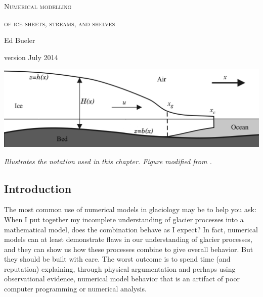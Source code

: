 \documentclass[letterpaper,final,12pt,reqno]{amsart}
\begin{document}
\graphicspath{{../photos/}{../pdffigs/}}

\begin{titlepage}

  \begin{center}
  \phantom{foo}
    \vspace{1.0cm}

     {\Large \textsc{Numerical modelling}}
    \vspace{0.7cm}

     {\Large \textsc{of ice sheets, streams, and shelves}}

    \vspace{1.5cm}

    {\large Ed Bueler}
    \vspace{1cm}

    version July 2014

    \vfill
    
    \includegraphics[width=6.0in]{flowline}
  
    \scriptsize \emph{Illustrates the notation used in this chapter.  Figure modified from \cite{SchoofMarine1}.} \normalsize
    
    \vspace{1.5in}
  \end{center}
\end{titlepage}

\clearpage\newpage

\setcounter{section}{1}
\subsection{Introduction}

The most common use of numerical models in glaciology may be to help you ask: When I put together my incomplete understanding of glacier processes into a mathematical model, does the combination behave as I expect?  In fact, numerical models can at least demonstrate flaws in our understanding of glacier processes, and they can show us how these processes combine to give overall behavior.  But they should be built with care.  The worst outcome is to spend time (and reputation) explaining, through physical argumentation and perhaps using observational evidence, numerical model behavior that is an artifact of poor computer programming or numerical analysis.
\end{document}
